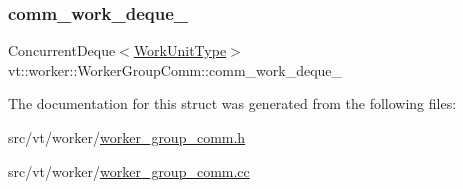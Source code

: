 \subsubsection{\texorpdfstring{comm\+\_\+work\+\_\+deque\+\_\+}{comm\_work\_deque\_}}
{\footnotesize\ttfamily Concurrent\+Deque$<$\hyperlink{namespacevt_1_1worker_a59d2fcdafa81fc0af7f921a258e42202}{Work\+Unit\+Type}$>$ vt\+::worker\+::\+Worker\+Group\+Comm\+::comm\+\_\+work\+\_\+deque\+\_\+\hspace{0.3cm}{\ttfamily [protected]}}



The documentation for this struct was generated from the following files\+:\begin{DoxyCompactItemize}
\item 
src/vt/worker/\hyperlink{worker__group__comm_8h}{worker\+\_\+group\+\_\+comm.\+h}\item 
src/vt/worker/\hyperlink{worker__group__comm_8cc}{worker\+\_\+group\+\_\+comm.\+cc}\end{DoxyCompactItemize}
